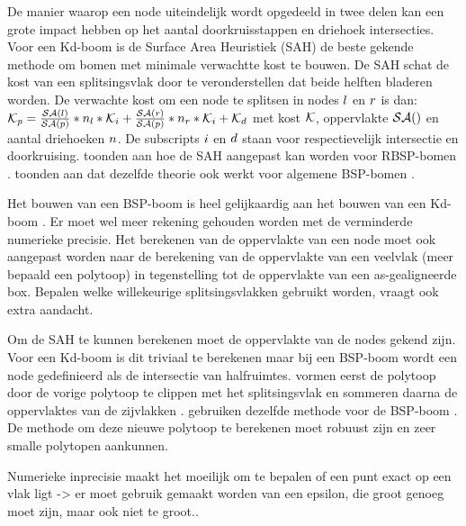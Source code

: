 De manier waarop een node uiteindelijk wordt opgedeeld in twee delen kan een grote impact hebben op het aantal doorkruisstappen en driehoek intersecties.
Voor een Kd-boom is de Surface Area Heuristiek (SAH) de beste gekende methode om bomen met minimale verwachtte kost te bouwen.
De SAH schat de kost van een splitsingsvlak door te veronderstellen dat beide helften bladeren worden. 
De verwachte kost om een node {\symNodeExample} te splitsen in nodes ${l}$ en ${r}$ is dan: $\mathcal{K}_p = \frac{\mathcal{SA}(l)}{\mathcal{SA}(p)}*n_l*\mathcal{K}_i + \frac{\mathcal{SA}(r)}{\mathcal{SA}(p)}*n_r*\mathcal{K}_i + \mathcal{K}_d$ met kost $\mathcal{K}$, oppervlakte $\mathcal{SA}()$ en aantal driehoeken $n$.
De subscripts ${i}$ en ${d}$ staan voor respectievelijk intersectie en doorkruising.
\authorKammaje{ }toonden aan hoe de SAH aangepast kan worden voor RBSP-bomen \cite{Kammaje}. 
\authorIze{ }toonden aan dat dezelfde theorie ook werkt voor algemene BSP-bomen \cite{Ize}.

Het bouwen van een BSP-boom is heel gelijkaardig aan het bouwen van een Kd-boom \cite{Ize}. 
Er moet wel meer rekening gehouden worden met de verminderde numerieke precisie. 
Het berekenen van de oppervlakte van een node moet ook aangepast worden naar de berekening van de oppervlakte van een veelvlak (meer bepaald een polytoop) in tegenstelling tot de oppervlakte van een as-gealigneerde box.
Bepalen welke willekeurige splitsingsvlakken gebruikt worden, vraagt ook extra aandacht.

Om de SAH te kunnen berekenen moet de oppervlakte van de nodes gekend zijn. 
Voor een Kd-boom is dit triviaal te berekenen maar bij een BSP-boom wordt een node gedefinieerd als de intersectie van halfruimtes.
\authorKammaje{ }vormen eerst de polytoop door de vorige polytoop te clippen met het splitsingsvlak en sommeren daarna de oppervlaktes van de zijvlakken \cite{Kammaje}.
\authorIze{ }gebruiken dezelfde methode voor de BSP-boom \cite{Ize}.
De methode om deze nieuwe polytoop te berekenen moet robuust zijn en zeer smalle polytopen aankunnen.

Numerieke inprecisie maakt het moeilijk om te bepalen of een punt exact op een vlak ligt -> er moet gebruik gemaakt worden van een epsilon, die groot genoeg moet zijn, maar ook niet te groot.\cite{Ize}.  

